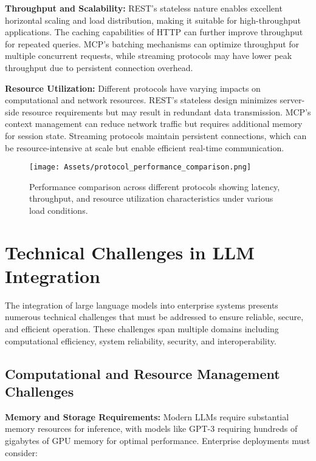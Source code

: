 \textbf{Throughput and Scalability:}
REST's stateless nature enables excellent horizontal scaling and load distribution, making it suitable for high-throughput applications. The caching capabilities of HTTP can further improve throughput for repeated queries. MCP's batching mechanisms can optimize throughput for multiple concurrent requests, while streaming protocols may have lower peak throughput due to persistent connection overhead.

\textbf{Resource Utilization:}
Different protocols have varying impacts on computational and network resources. REST's stateless design minimizes server-side resource requirements but may result in redundant data transmission. MCP's context management can reduce network traffic but requires additional memory for session state. Streaming protocols maintain persistent connections, which can be resource-intensive at scale but enable efficient real-time communication.

\begin{figure}[H]
    \centering
    \texttt{[image: Assets/protocol\_performance\_comparison.png]}
    \caption{Performance comparison across different protocols showing latency, throughput, and resource utilization characteristics under various load conditions.}
    \label{fig:protocol_performance_comparison}
\end{figure}

\section{Technical Challenges in LLM Integration}

The integration of large language models into enterprise systems presents numerous technical challenges that must be addressed to ensure reliable, secure, and efficient operation. These challenges span multiple domains including computational efficiency, system reliability, security, and interoperability.

\subsection{Computational and Resource Management Challenges}

\textbf{Memory and Storage Requirements:}
Modern LLMs require substantial memory resources for inference, with models like GPT-3 requiring hundreds of gigabytes of GPU memory for optimal performance. Enterprise deployments must consider:

